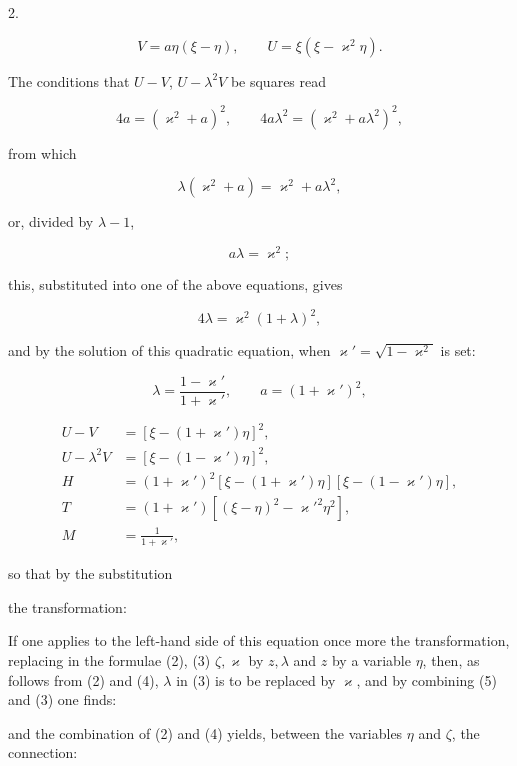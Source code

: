 \begin{center}
2. 
\end{center}

\[
V = a\eta(\xi-\eta), \qquad U = \xi(\xi-\varkappa^2\eta).
\]

The conditions that $U-V$, $U-\lambda^2V$ be squares read

\[
4a = (\varkappa^2+a)^2, \qquad 4a\lambda^2 = (\varkappa^2+a\lambda^2)^2,
\]

from which

\[
\lambda(\varkappa^2+a) = \varkappa^2+a\lambda^2,
\]

or, divided by $\lambda-1$,

\[
a\lambda = \varkappa^2;
\]

this, substituted into one of the above equations, gives

\[
4\lambda = \varkappa^2(1+\lambda)^2,
\]

and by the solution of this quadratic equation, when
$\varkappa'=\sqrt{1-\varkappa^2}$ is set:

\[
\lambda = \frac{1-\varkappa'}{1+\varkappa'}, \qquad a=(1+\varkappa')^2,
\]

\[
\begin{aligned}
U-V &= [\xi-(1+\varkappa')\eta]^2,\\
U-\lambda^2V &= [\xi-(1-\varkappa')\eta]^2,\\
H &= (1+\varkappa')^2[\xi-(1+\varkappa')\eta][\xi-(1-\varkappa')\eta],\\
T &= (1+\varkappa')[(\xi-\eta)^2-\varkappa'^2\eta^2],\\
M &= \frac{1}{1+\varkappa'},
\end{aligned}
\]

so that by the substitution


the transformation:


If one applies to the left-hand side of this equation once more the
 transformation, replacing in the formulae (2), (3)
$\zeta,\varkappa$ by $z,\lambda$ and $z$ by a variable $\eta$, then, as
follows from (2) and (4), $\lambda$ in (3) is to be replaced by
$\varkappa$, and by combining (5) and (3) one finds:


and the combination of (2) and (4) yields, between the variables $\eta$
and $\zeta$, the connection:

